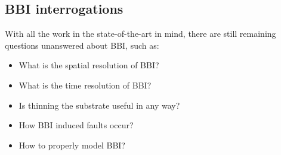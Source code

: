 	\subsection{BBI interrogations}
		With all the work in the state-of-the-art in mind, there are still remaining questions unanswered about BBI, such as:
		\begin{itemize}
			\item What is the spatial resolution of BBI?
			\item What is the time resolution of BBI?
			\item Is thinning the substrate useful in any way?
			\item How BBI induced faults occur?
			\item How to properly model BBI?
		\end{itemize}